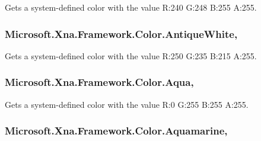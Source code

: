 Gets a system-\/defined color with the value R\+:240 G\+:248 B\+:255 A\+:255.

\hypertarget{struct_microsoft_1_1_xna_1_1_framework_1_1_color_ab39b87a8ed65d6b13da1f6b88f95ec6f}{}
\subsubsection[{Antique\+White}]{ Microsoft.\+Xna.\+Framework.\+Color.\+Antique\+White\hspace{0.3cm}{\ttfamily [static]}, {\ttfamily [get]}}\label{struct_microsoft_1_1_xna_1_1_framework_1_1_color_ab39b87a8ed65d6b13da1f6b88f95ec6f}


Gets a system-\/defined color with the value R\+:250 G\+:235 B\+:215 A\+:255.

\hypertarget{struct_microsoft_1_1_xna_1_1_framework_1_1_color_a363a0d93bc01ecef431d8a6db0d3dcaa}{}
\subsubsection[{Aqua}]{ Microsoft.\+Xna.\+Framework.\+Color.\+Aqua\hspace{0.3cm}{\ttfamily [static]}, {\ttfamily [get]}}\label{struct_microsoft_1_1_xna_1_1_framework_1_1_color_a363a0d93bc01ecef431d8a6db0d3dcaa}


Gets a system-\/defined color with the value R\+:0 G\+:255 B\+:255 A\+:255.

\hypertarget{struct_microsoft_1_1_xna_1_1_framework_1_1_color_a348181022a36f035d4b23cd4e5c7ca2f}{}
\subsubsection[{Aquamarine}]{ Microsoft.\+Xna.\+Framework.\+Color.\+Aquamarine\hspace{0.3cm}{\ttfamily [static]}, {\ttfamily [get]}}\label{struct_microsoft_1_1_xna_1_1_framework_1_1_color_a348181022a36f035d4b23cd4e5c7ca2f}


